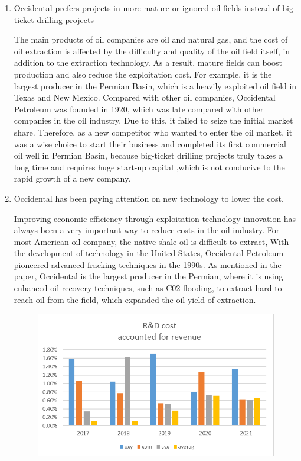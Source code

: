 \documentclass[
	a4paper, %
	12pt,%
]{CSSullivanBusinessReport}
\begin{document}
\begin{fullwidth}
\begin{enumerate}
    \item Occidental prefers projects in more mature or ignored oil fields instead of big-ticket drilling projects
    \par
    The main products of oil companies are oil and natural gas, and the cost of oil extraction is affected by the difficulty and quality of the oil field itself, in addition to the extraction technology. As a result, mature fields can boost production and also reduce the exploitation cost. For example, it is the largest producer in the Permian Basin, which is a heavily exploited oil field in Texas and New Mexico. Compared with other oil companies, Occidental Petroleum was founded in 1920, which was late compared with other companies in the oil industry. Due to this, it failed to seize the initial market share. Therefore, as a new competitor who wanted to enter the oil market, it was a wise choice to start their business and completed its first commercial oil well in Permian Basin, because big-ticket drilling projects truly takes a long time and requires huge start-up capital ,which is not conducive to the rapid growth of a new company.
    \item Occidental has been paying attention on new technology to lower the cost. \par
    Improving economic efficiency through exploitation technology innovation has always been a very important way to reduce costs in the oil industry. For most American oil company, the native shale oil is difficult to extract, With the development of technology in the United States, Occidental Petroleum pioneered advanced fracking techniques in the 1990s. As mentioned in the paper, Occidental is the largest producer in the Permian, where it is using enhanced oil-recovery techniques, such as C02 flooding, to extract hard-to-reach oil from the field, which expanded the oil yield of extraction.
    \begin{figure}[h]
        \centering
        \includegraphics{Images/rd cost.png}

\end{figure}
\end{enumerate}
\end{fullwidth}
\end{document}
